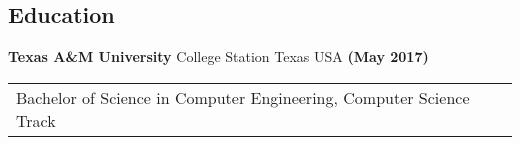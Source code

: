 \documentclass[margin,line,12pt]{res}
\newenvironment{list1}{
\begin{list}{\ding{113}}{%
  \setlength{\itemsep}{0in}
  \setlength{\parsep}{0in} \setlength{\parskip}{0in}
  \setlength{\topsep}{0in} \setlength{\partopsep}{0in}
  \setlength{\leftmargin}{0.17in}}}{\end{list}}
\newenvironment{list2}{
\begin{list}{$\bullet$}{%
  \setlength{\itemsep}{0in}
  \setlength{\parsep}{0in} \setlength{\parskip}{0in}
  \setlength{\topsep}{0in} \setlength{\partopsep}{0in}
  \setlength{\leftmargin}{0.2in}}}{\end{list}}
\begin{document}
{\begin{resume}
\color{black}
{\color{Black}
  \vspace{-.1in}
  \section{\sc Education}}

{\bf Texas A\&M University} College Station Texas USA \hfill {\bf (May 2017)} \ \\
\vspace*{-.17in}
\begin{tabular}{l l l}
  Bachelor of Science in Computer Engineering, Computer Science Track \\
\end{tabular}





\end{resume}}
\end{document}
